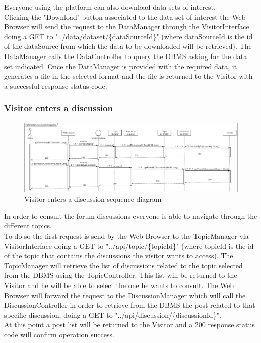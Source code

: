 Everyone using the platform can also download data sets of interest.\\ 
Clicking the "Download" button associated to the data set of interest the Web Browser will send the request to the DataManager through the VisitorInterface doing a GET to "../data/dataset/\{dataSourceId\}" (where dataSourceId is the id of the dataSource from which the data to be downloaded will be retrieved).
The DataManager calls the DataController to query the DBMS asking for the data set indicated. Once the DataManager is provided with the required data, it generates a file in the selected format and the file is returned to the Visitor with a successful response status code.

\subsubsection{Visitor enters a discussion}

\begin{figure}[h!]
        \centering
        \includegraphics[scale=0.25]{images/runtime_view/visitor_enters_discussion_runtime_view_diagram.png}
        \caption{Visitor enters a discussion sequence diagram}
        \label{fig:visitor_enters_discussion_sequence_diagram}
\end{figure}
\FloatBarrier

In order to consult the forum discussions everyone is able to navigate through the different topics.\\
To do so the first request is send by the Web Browser to the TopicManager via VisitorInterface doing a GET to "../api/topic/\{topicId\}" (where topicId is the id of the topic that contains the discussions the visitor wants to access). The TopicManager will retrieve the list of discussions related to the topic selected from the DBMS using the TopicController. This list will be returned to the Visitor and he will be able to select the one he wants to consult. The Web Browser will forward the request to the DiscussionManager which will call the DiscussionController in order to retrieve from the DBMS the post related to that specific discussion, doing a GET to "../api/discussion/\{discussionId\}".\\
At this point a post list will be returned to the Visitor and a 200 response status code will confirm operation success.

